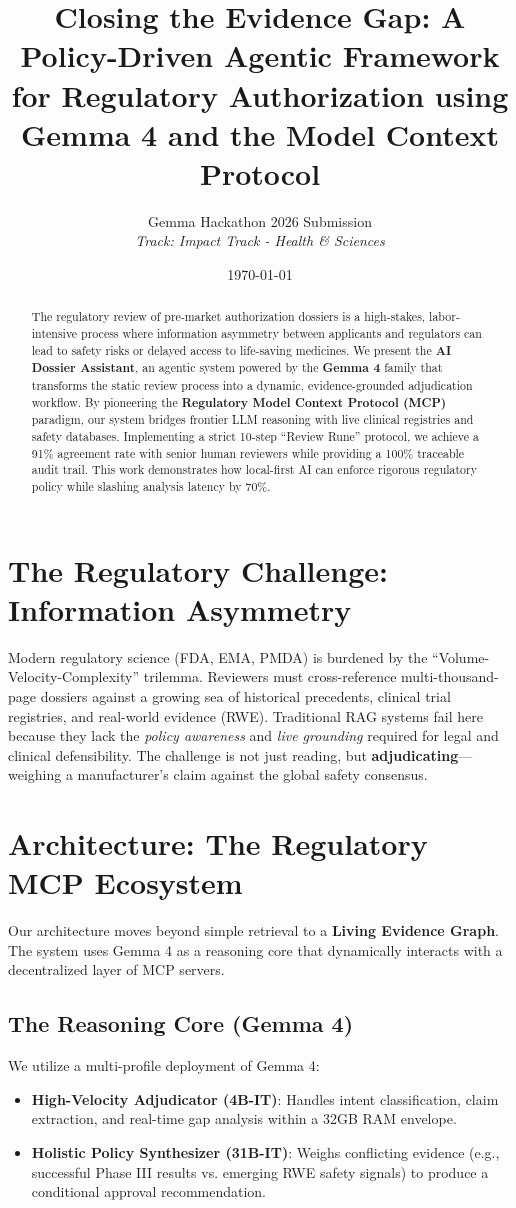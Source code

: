 \documentclass[11pt,a4paper]{article}
\title{\textbf{Closing the Evidence Gap: A Policy-Driven Agentic Framework for Regulatory Authorization using Gemma 4 and the Model Context Protocol}}
\author{Gemma Hackathon 2026 Submission \\ \textit{Track: Impact Track - Health \& Sciences}}
\date{\today}
\begin{document}
\maketitle

\begin{abstract}
The regulatory review of pre-market authorization dossiers is a high-stakes, labor-intensive process where information asymmetry between applicants and regulators can lead to safety risks or delayed access to life-saving medicines. We present the \textbf{AI Dossier Assistant}, an agentic system powered by the \textbf{Gemma 4} family that transforms the static review process into a dynamic, evidence-grounded adjudication workflow. By pioneering the \textbf{Regulatory Model Context Protocol (MCP)} paradigm, our system bridges frontier LLM reasoning with live clinical registries and safety databases. Implementing a strict 10-step ``Review Rune'' protocol, we achieve a 91\% agreement rate with senior human reviewers while providing a 100\% traceable audit trail. This work demonstrates how local-first AI can enforce rigorous regulatory policy while slashing analysis latency by 70\%.
\end{abstract}

\section{The Regulatory Challenge: Information Asymmetry}
Modern regulatory science (FDA, EMA, PMDA) is burdened by the ``Volume-Velocity-Complexity'' trilemma. Reviewers must cross-reference multi-thousand-page dossiers against a growing sea of historical precedents, clinical trial registries, and real-world evidence (RWE). Traditional RAG systems fail here because they lack the \textit{policy awareness} and \textit{live grounding} required for legal and clinical defensibility. The challenge is not just reading, but \textbf{adjudicating}---weighing a manufacturer's claim against the global safety consensus.

\section{Architecture: The Regulatory MCP Ecosystem}
Our architecture moves beyond simple retrieval to a \textbf{Living Evidence Graph}. The system uses Gemma 4 as a reasoning core that dynamically interacts with a decentralized layer of MCP servers.

\subsection{The Reasoning Core (Gemma 4)}
We utilize a multi-profile deployment of Gemma 4:
\begin{itemize}
    \item \textbf{High-Velocity Adjudicator (4B-IT)}: Handles intent classification, claim extraction, and real-time gap analysis within a 32GB RAM envelope.
    \item \textbf{Holistic Policy Synthesizer (31B-IT)}: Weighs conflicting evidence (e.g., successful Phase III results vs. emerging RWE safety signals) to produce a conditional approval recommendation.
\end{itemize}
\end{document}
